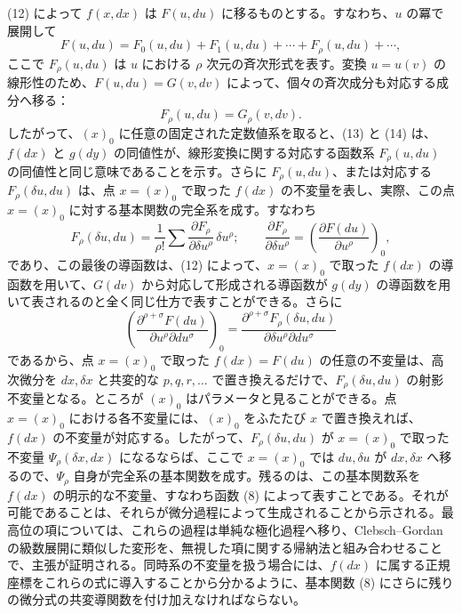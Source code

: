 (12) によって \(f(x,dx)\) は \(F(u,du)\) に移るものとする。すなわち、\(u\) の冪で展開して
\begin{equation}
F(u,du)=F_0(u,du)+F_1(u,du)+\cdots+F_\rho(u,du)+\cdots,
\tag{13}
\end{equation}
ここで \(F_\rho(u,du)\) は \(u\) における \(\rho\) 次元の斉次形式を表す。変換 \(u=u(v)\) の線形性のため、\(F(u,du)=G(v,dv)\) によって、個々の斉次成分も対応する成分へ移る：
\begin{equation}
F_\rho(u,du)=G_\rho(v,dv).
\tag{14}
\end{equation}
したがって、\((x)_0\) に任意の固定された定数値系を取ると、(13) と (14) は、\(f(dx)\) と \(g(dy)\) の同値性が、線形変換に関する対応する函数系 \(F_\rho(u,du)\) の同値性と同じ意味であることを示す。さらに \(F_\rho(u,du)\)、または対応する \(F_\rho(\delta u,du)\) は、点 \(x=(x)_0\) で取った \(f(dx)\) の不変量を表し、実際、この点 \(x=(x)_0\) に対する基本関数の完全系を成す。すなわち
\[
F_\rho(\delta u,du)=\frac1{\rho!}\sum
\frac{\partial F_\rho}{\partial \delta u^\rho}\,\delta u^\rho;
\qquad
\frac{\partial F_\rho}{\partial \delta u^\rho}
=\left(\frac{\partial F(du)}{\partial u^\rho}\right)_0,
\]
であり、この最後の導函数は、(12) によって、\(x=(x)_0\) で取った \(f(dx)\) の導函数を用いて、\(G(dv)\) から対応して形成される導函数が \(g(dy)\) の導函数を用いて表されるのと全く同じ仕方で表すことができる。さらに
\[
\left(\frac{\partial^{\rho+\sigma}F(du)}
{\partial u^\rho\partial du^\sigma}\right)_0
=
\frac{\partial^{\rho+\sigma}F_\rho(\delta u,du)}
{\partial\delta u^\rho\partial du^\sigma}
\]
であるから、点 \(x=(x)_0\) で取った \(f(dx)=F(du)\) の任意の不変量は、高次微分を \(dx,\delta x\) と共変的な \(p,q,r,\ldots\) で置き換えるだけで、\(F_\rho(\delta u,du)\) の射影不変量となる。ところが \((x)_0\) はパラメータと見ることができる。点 \(x=(x)_0\) における各不変量には、\((x)_0\) をふたたび \(x\) で置き換えれば、\(f(dx)\) の不変量が対応する。したがって、\(F_\rho(\delta u,du)\) が \(x=(x)_0\) で取った不変量 \(\Psi_\rho(\delta x,dx)\) になるならば、ここで \(x=(x)_0\) では \(du,\delta u\) が \(dx,\delta x\) へ移るので、\(\Psi_\rho\) 自身が完全系の基本関数を成す。残るのは、この基本関数系を \(f(dx)\) の明示的な不変量、すなわち函数 (8) によって表すことである。それが可能であることは、それらが微分過程によって生成されることから示される。最高位の項については、これらの過程は単純な極化過程へ移り、Clebsch--Gordan の級数展開に類似した変形を、無視した項に関する帰納法と組み合わせることで、主張が証明される。同時系の不変量を扱う場合には、\(f(dx)\) に属する正規座標をこれらの式に導入することから分かるように、基本関数 (8) にさらに残りの微分式の共変導関数を付け加えなければならない。

